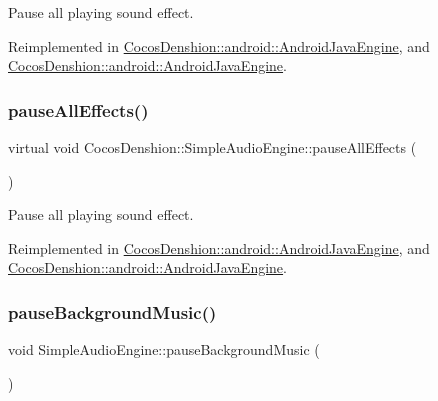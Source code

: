 Pause all playing sound effect. 

Reimplemented in \hyperlink{classCocosDenshion_1_1android_1_1AndroidJavaEngine_ab7cd6dcfb8f652b064da4a2ae1edde63}{Cocos\+Denshion\+::android\+::\+Android\+Java\+Engine}, and \hyperlink{classCocosDenshion_1_1android_1_1AndroidJavaEngine_a6f43c4386764a96b0fd604d2bf527274}{Cocos\+Denshion\+::android\+::\+Android\+Java\+Engine}.

\mbox{\label{classCocosDenshion_1_1SimpleAudioEngine_a7533eda959dd0aec19d17daeb08e4635}} 
\subsubsection{\texorpdfstring{pause\+All\+Effects()}{pauseAllEffects()}\hspace{0.1cm}{\footnotesize\ttfamily [2/2]}}
{\footnotesize\ttfamily virtual void Cocos\+Denshion\+::\+Simple\+Audio\+Engine\+::pause\+All\+Effects (\begin{DoxyParamCaption}{ }\end{DoxyParamCaption})\hspace{0.3cm}{\ttfamily [virtual]}}

Pause all playing sound effect. 

Reimplemented in \hyperlink{classCocosDenshion_1_1android_1_1AndroidJavaEngine_ab7cd6dcfb8f652b064da4a2ae1edde63}{Cocos\+Denshion\+::android\+::\+Android\+Java\+Engine}, and \hyperlink{classCocosDenshion_1_1android_1_1AndroidJavaEngine_a6f43c4386764a96b0fd604d2bf527274}{Cocos\+Denshion\+::android\+::\+Android\+Java\+Engine}.

\mbox{\label{classCocosDenshion_1_1SimpleAudioEngine_addf0536bfbb9ad38668108ee289ccaf6}} 
\subsubsection{\texorpdfstring{pause\+Background\+Music()}{pauseBackgroundMusic()}\hspace{0.1cm}{\footnotesize\ttfamily [1/2]}}
{\footnotesize\ttfamily void Simple\+Audio\+Engine\+::pause\+Background\+Music (\begin{DoxyParamCaption}{ }\end{DoxyParamCaption})\hspace{0.3cm}{\ttfamily [virtual]}}

